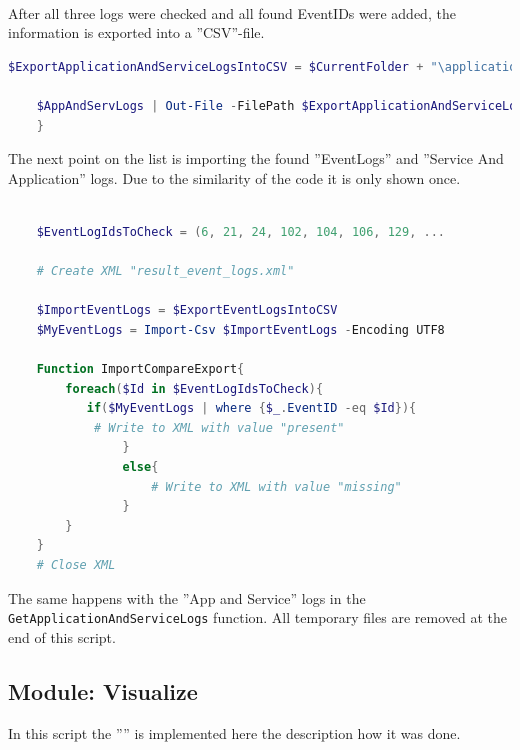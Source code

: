 \clearpage \ \\
After all three logs were checked and all found EventIDs were added, the information is exported into a ''CSV''-file.
\begin{lstlisting}[caption=Function GetApplicationAndServiceLogs Part 2, language=PowerShell]
    $ExportApplicationAndServiceLogsIntoCSV = $CurrentFolder + "\applicationandservicelogs.csv"

    $AppAndServLogs | Out-File -FilePath $ExportApplicationAndServiceLogsIntoCSV
    }
\end{lstlisting}
The next point on the list is importing the found ''EventLogs'' and ''Service And Application'' logs. Due to the similarity of the code it is only shown once.
\begin{lstlisting}[caption=Function ImportCompareExport, language=PowerShell]
    
    $EventLogIdsToCheck = (6, 21, 24, 102, 104, 106, 129, ...

    # Create XML "result_event_logs.xml"

    $ImportEventLogs = $ExportEventLogsIntoCSV
    $MyEventLogs = Import-Csv $ImportEventLogs -Encoding UTF8

    Function ImportCompareExport{
        foreach($Id in $EventLogIdsToCheck){
           if($MyEventLogs | where {$_.EventID -eq $Id}){
            # Write to XML with value "present"
                }
                else{
                    # Write to XML with value "missing"
                }
        }
    }
    # Close XML
\end{lstlisting}
The same happens with the ''App and Service'' logs in the \lstinline|GetApplicationAndServiceLogs| function. All temporary files are removed at the end of this script.
\clearpage
\subsection{Module: Visualize}
In this script the '''' is implemented here the description how it was done.
